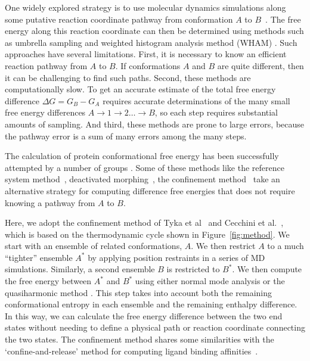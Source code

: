 \documentclass[12pt]{article}
\begin{document}
One widely explored strategy
is to use molecular dynamics simulations along some putative reaction coordinate pathway from conformation $A$ to
$B$~\cite{Elber2007,West2007,Haas2007,Jonsson1998,E2007,Dellago2002,Cheng2006,Elber2005,Chipot2007}. The free energy along this
reaction coordinate can then be determined using methods such as umbrella sampling \cite{Torrie1977,Mascarenhas2013}  
and weighted histogram analysis method (WHAM) \cite{Kumar1992}. Such
approaches have several limitations. First, it is necessary to know an efficient reaction pathway from $A$ to $B$. If
conformations $A$ and $B$ are quite different, then it can be challenging to find such paths. Second, these methods are
computationally slow. To get an accurate estimate of the total free energy difference $\Delta G = G_B - G_A$ requires
accurate determinations of the many small free energy differences $A \rightarrow 1 \rightarrow 2 \ldots \rightarrow B$,
so each step requires substantial amounts of sampling.  And third, these methods are prone to large errors, because the
pathway error is a sum of many errors among the many steps.

The calculation of protein conformational free energy has been successfully attempted by a number of groups
\cite{Shell2010,Ytreberg2006,Zheng2008,Spichty2010,Strajbl2000,Park2008,Tyka2006,Cecchini2009,Ovchinnikov2013}. Some of
these methods like the reference system method~\cite{Ytreberg2006}, deactivated morphing~\cite{Park2008}, the
confinement method~\cite{Tyka2006,Cecchini2009,Ovchinnikov2013} take an alternative strategy for computing difference
free energies that does not require knowing a pathway from $A$ to $B$.  

Here, we adopt the confinement method of Tyka et al~\cite{Tyka2006} and Cecchini et al.~\cite{Cecchini2009}, which is
based on the thermodynamic cycle shown in Figure~\ref{fig:method}. We start with an ensemble of related conformations,
$A$. We then restrict $A$ to a much ``tighter'' ensemble $A^\ast$ by applying position restraints in a series of MD
simulations. Similarly, a second ensemble $B$ is restricted to $B^\ast$. We then compute the free energy between
$A^\ast$ and $B^\ast$ using either normal mode analysis \cite{Brooks1983,Case1994} or the quasiharmonic 
method \cite{Karplus1981,Levy1984}. This step takes into account
both the remaining conformational entropy in each ensemble and the remaining enthalpy difference. In this way, we can
calculate the free energy difference between the two end states without needing to define a physical path or reaction
coordinate connecting the two states. The confinement method shares some similarities with the `confine-and-release'
method for computing ligand binding affinities~\cite{Mobley2007,Mobley2012,Mobley2006}.
\end{document}
